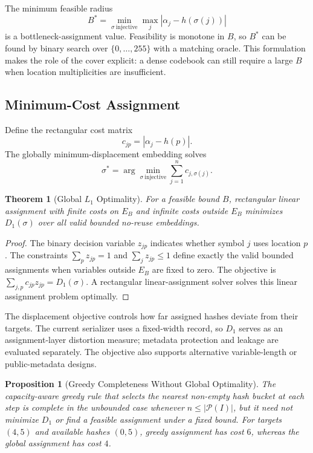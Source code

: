 \documentclass[preprint,12pt]{elsarticle}
\theoremstyle{plain}
\newtheorem{theorem}{Theorem}
\newtheorem{proposition}{Proposition}
\begin{document}
The minimum feasible radius
\begin{equation}
    B^*=\min_{\sigma\ \mathrm{injective}}\max_j
    |\alpha_j-h(\sigma(j))|
\end{equation}
is a bottleneck-assignment value. Feasibility is monotone in $B$, so $B^*$ can
be found by binary search over $\{0,\ldots,255\}$ with a matching oracle. This
formulation makes the role of the cover explicit: a dense codebook can still
require a large $B$ when location multiplicities are insufficient.

\subsection{Minimum-Cost Assignment}

Define the rectangular cost matrix
\begin{equation}
    c_{jp}=|\alpha_j-h(p)|.
\end{equation}
The globally minimum-displacement embedding solves
\begin{equation}
    \sigma^*=\arg\min_{\sigma\ \mathrm{injective}}
    \sum_{j=1}^{n}c_{j,\sigma(j)}.
\end{equation}

\begin{theorem}[Global $L_1$ Optimality]
\label{thm:assignment_optimality}
For a feasible bound $B$, rectangular linear assignment with finite costs on
$E_B$ and infinite costs outside $E_B$ minimizes $D_1(\sigma)$ over all valid
bounded no-reuse embeddings.
\end{theorem}
\begin{proof}
The binary decision variable $z_{jp}$ indicates whether symbol $j$ uses
location $p$. The constraints
$\sum_p z_{jp}=1$ and $\sum_j z_{jp}\leq1$ define exactly the valid bounded
assignments when variables outside $E_B$ are fixed to zero. The objective is
$\sum_{j,p}c_{jp}z_{jp}=D_1(\sigma)$. A rectangular linear-assignment solver solves this
linear assignment problem optimally.
\end{proof}

The displacement objective controls how far assigned hashes deviate from their
targets. The current serializer uses a fixed-width record, so $D_1$ serves as
an assignment-layer distortion measure; metadata protection and leakage are
evaluated separately. The objective also supports alternative variable-length
or public-metadata designs.

\begin{proposition}[Greedy Completeness Without Global Optimality]
The capacity-aware greedy rule that selects the nearest non-empty hash bucket
at each step is complete in the unbounded case whenever
$n\leq|\mathcal{P}(I)|$, but it need not minimize $D_1$ or find a feasible
assignment under a fixed bound. For targets $(4,5)$ and available hashes $(0,5)$, greedy
assignment has cost $6$, whereas the global assignment has cost $4$.
\end{proposition}
\end{document}
